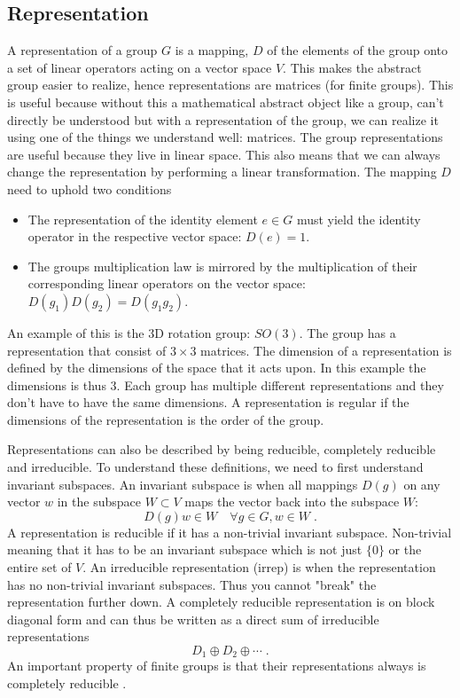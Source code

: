 \subsection{Representation}
A representation of a group $G$ is a mapping, $D$ of the elements of the group onto a set of linear operators acting on a vector space $V$. This makes the abstract group easier to realize, hence representations are matrices (for finite groups). This is useful because without this a mathematical abstract object like a group, can't directly be understood but with a representation of the group, we can realize it using one of the things we understand well: matrices. The group representations are useful because they live in linear space. This also means that we can always change the representation by performing a linear transformation. The mapping $D$ need to uphold two conditions
\begin{itemize}
    \item The representation of the identity element $e\in G$ must yield the identity operator in the respective vector space: $D(e)=1$. 
    \item The groups multiplication law is mirrored by the multiplication of their corresponding linear operators on the vector space: $D(g_1)D(g_2)=D(g_1g_2)$.
\end{itemize}
An example of this is the 3D rotation group: $SO(3)$. The group has a representation that consist of $3\times 3$ matrices. The dimension of a representation is defined by the dimensions of the space that it acts upon. In this example the dimensions is thus $3$. Each group has multiple different representations and they don't have to have the same dimensions. A representation is regular if the dimensions of the representation is the order of the group. 

Representations can also be described by being reducible, completely reducible and irreducible. To understand these definitions, we need to first understand invariant subspaces. An invariant subspace is when all mappings $D(g)$ on any vector $w$ in the subspace $W\subset V $ maps the vector back into the subspace $W$:
\begin{equation}
    D(g)w\in W\quad \forall g\in G, w\in W\;.
\end{equation}
A representation is reducible if it has a non-trivial invariant subspace. Non-trivial meaning that it has to be an invariant subspace which is not just $\{0\}$ or the entire set of $V$. An irreducible representation (irrep) is when the representation has no non-trivial invariant subspaces. Thus you cannot "break" the representation further down. A completely reducible representation is on block diagonal form and can thus be written as a direct sum of irreducible representations
\begin{equation}
    D_1\oplus D_2 \oplus \cdots\;.
\end{equation}
An important property of finite groups is that their representations always is completely reducible \cite{Georgi1999}.

